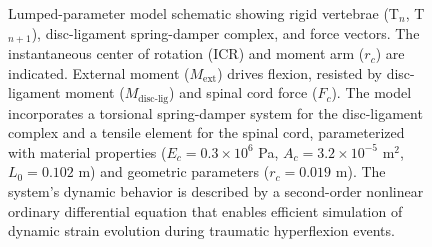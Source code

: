 \begin{figure}[H]
    \caption{Lumped-parameter model schematic showing rigid vertebrae (T$_n$, T$_{n+1}$), disc-ligament spring-damper complex, and force vectors. The instantaneous center of rotation (ICR) and moment arm ($r_c$) are indicated. External moment ($M_{\text{ext}}$) drives flexion, resisted by disc-ligament moment ($M_{\text{disc-lig}}$) and spinal cord force ($F_c$). The model incorporates a torsional spring-damper system for the disc-ligament complex and a tensile element for the spinal cord, parameterized with material properties ($E_c = 0.3 \times 10^6$ Pa, $A_c = 3.2 \times 10^{-5}$ m$^2$, $L_0 = 0.102$ m) and geometric parameters ($r_c = 0.019$ m). The system's dynamic behavior is described by a second-order nonlinear ordinary differential equation that enables efficient simulation of dynamic strain evolution during traumatic hyperflexion events.}
    \label{fig:model_schematic}
\end{figure} 